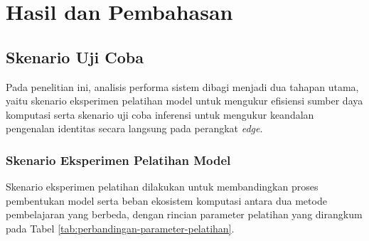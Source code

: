 \chapter{Hasil dan Pembahasan}
\label{chap:hasil-pembahasan}

\section{Skenario Uji Coba}
\label{sec:skenario-uji-coba}

Pada penelitian ini, analisis performa sistem dibagi menjadi dua tahapan utama, yaitu skenario eksperimen pelatihan model untuk mengukur efisiensi sumber daya komputasi serta skenario uji coba inferensi untuk mengukur keandalan pengenalan identitas secara langsung pada perangkat \textit{edge}.

\subsection{Skenario Eksperimen Pelatihan Model}
\label{subsec:skenario-pelatihan}

Skenario eksperimen pelatihan dilakukan untuk membandingkan proses pembentukan model serta beban ekosistem komputasi antara dua metode pembelajaran yang berbeda, dengan rincian parameter pelatihan yang dirangkum pada Tabel \ref{tab:perbandingan-parameter-pelatihan}.

